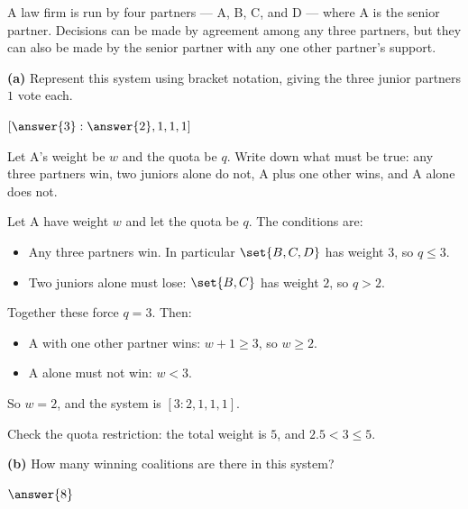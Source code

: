 \documentclass[12pt]{ximera}
\begin{document}
\begin{problem}
A law firm is run by four partners --- A, B, C, and D --- where A is the senior
partner. Decisions can be made by agreement among any three partners, but they can
also be made by the senior partner with any one other partner's support.

\begin{prompt}
\textbf{(a)} Represent this system using bracket notation, giving the three junior
partners $1$ vote each.

$[\answer{3} : \answer{2}, 1, 1, 1]$

\begin{hint}
Let A's weight be $w$ and the quota be $q$. Write down what must be true: any three
partners win, two juniors alone do not, A plus one other wins, and A alone does not.
\end{hint}

\begin{feedback}
Let A have weight $w$ and let the quota be $q$. The conditions are:
\begin{itemize}
\item Any three partners win. In particular $\set{B,C,D}$ has weight $3$, so $q\le 3$.
\item Two juniors alone must lose: $\set{B,C}$ has weight $2$, so $q > 2$.
\end{itemize}
Together these force $q = 3$. Then:
\begin{itemize}
\item A with one other partner wins: $w+1 \ge 3$, so $w \ge 2$.
\item A alone must not win: $w < 3$.
\end{itemize}
So $w = 2$, and the system is $[3:2,1,1,1]$.

Check the quota restriction: the total weight is $5$, and $2.5 < 3 \le 5$. \checkmark
\end{feedback}
\end{prompt}

\begin{prompt}
\textbf{(b)} How many winning coalitions are there in this system?

$\answer{8}$


\end{prompt}
\end{problem}
\end{document}
